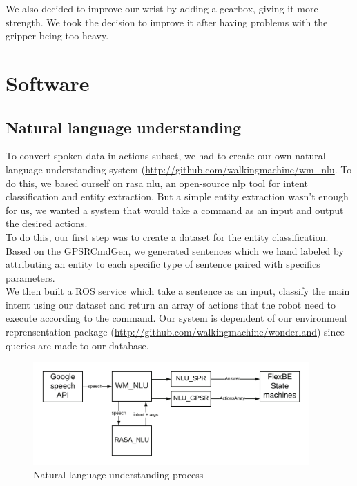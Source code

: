 \documentclass[runningheads,a4paper]{llncs}
\begin{document}
We also decided to improve our wrist by adding a gearbox, giving it more strength. We took the decision to improve it after having problems with the gripper being too heavy.  

\newpage
\section{Software}

\subsection{Natural language understanding}
\tab To convert spoken data in actions subset, we had to create our own natural language understanding system (\href{http://github.com/walkingmachine/wm\_nlu}{http://github.com/walkingmachine/wm\_nlu}. To do this, we based ourself on rasa nlu\cite{rasa}, an open-source nlp tool for intent classification and entity extraction. But a simple entity extraction wasn't enough for us, we wanted a system that would take a command as an input and output the desired actions.\\

To do this, our first step was to create a dataset for the entity classification. Based on the GPSRCmdGen, we generated sentences which we hand labeled by attributing an entity to each specific type of sentence paired with specifics parameters.\\

We then built a ROS service which take a sentence as an input, classify the main intent using our dataset and return an array of actions that the robot need to execute according to the command. Our system is dependent of our environment reprensentation package (\href{http://github.com/walkingmachine/wonderland}{http://github.com/walkingmachine/wonderland}) since queries are made to our database.

\begin{figure}
  \centering
  \includegraphics[width=300pt]{images/wm_nlu.png}
  \caption{Natural language understanding process}
\end{figure} 
\end{document}
